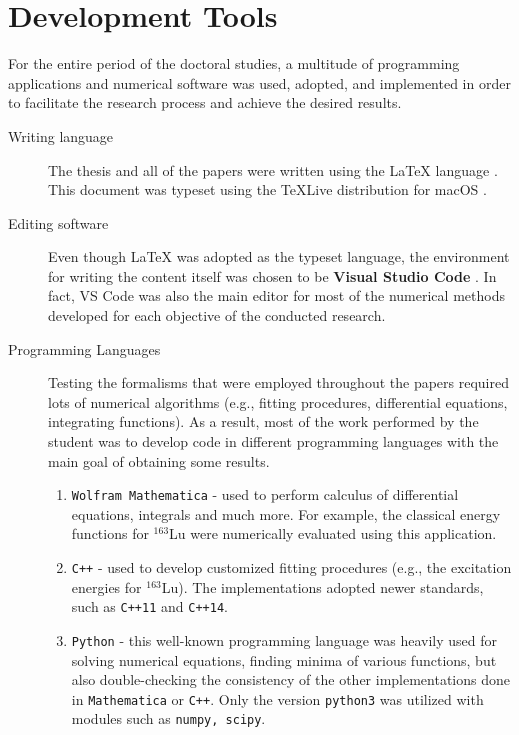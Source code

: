 \chapter{Development Tools}
\label{appendix:dev-tools}

For the entire period of the doctoral studies, a multitude of programming applications and numerical software was used, adopted, and implemented in order to facilitate the research process and achieve the desired results.

\begin{description}
    \item[Writing language] The thesis and all of the papers were written using the \LaTeX {} language \cite{lamport1986latex}. This document was typeset using the TeXLive distribution for macOS \cite{texlivemacos}.
    \item[Editing software] Even though \LaTeX {} was adopted as the typeset language, the environment for writing the content itself was chosen to be \textbf{Visual Studio Code} \cite{vscode}. In fact, VS Code was also the main editor for most of the numerical methods developed for each objective of the conducted research.
    \item[Programming Languages] Testing the formalisms that were employed throughout the papers required lots of numerical algorithms (e.g., fitting procedures, differential equations, integrating functions). As a result, most of the work performed by the student was to develop code in different programming languages with the main goal of obtaining some results.
    \begin{enumerate}
        \item \texttt{Wolfram Mathematica} \cite{WolframMathematica} - used to perform calculus of differential equations, integrals and much more. For example, the classical energy functions for $^{163}$Lu were numerically evaluated using this application.
        \item \texttt{C++} - used to develop customized fitting procedures (e.g., the excitation energies for $^{163}$Lu). The implementations adopted newer standards, such as \texttt{C++11} and \texttt{C++14}.
        \item \texttt{Python} - this well-known programming language was heavily used for solving numerical equations, finding minima of various functions, but also double-checking the consistency of the other implementations done in \texttt{Mathematica} or \texttt{C++}. Only the version \texttt{python3} was utilized with modules such as \texttt{numpy, scipy}.

\end{enumerate}
\end{description}
